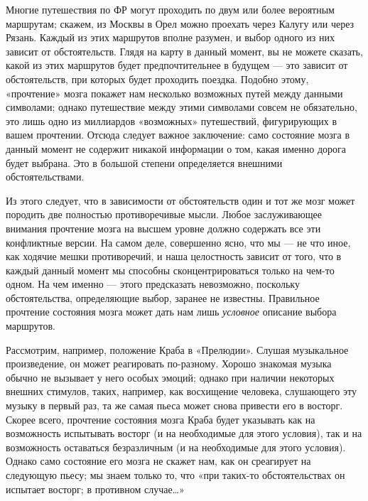 \documentclass[../main.tex]{subfiles}
\begin{document}
Многие путешествия по ФР могут проходить по двум или более вероятным маршрутам; скажем, из Москвы в Орел можно проехать через Калугу или через Рязань. Каждый из этих маршрутов вполне разумен, и выбор одного из них зависит от обстоятельств. Глядя на карту в данный момент, вы не можете сказать, какой из этих маршрутов будет предпочтительнее в будущем --- это зависит от обстоятельств, при которых будет проходить поездка. Подобно этому, «прочтение» мозга покажет нам несколько возможных путей между данными символами; однако путешествие между этими символами совсем не обязательно, это лишь одно из миллиардов «возможных» путешествий, фигурирующих в вашем прочтении. Отсюда следует важное заключение: само состояние мозга в данный момент не содержит никакой информации о том, какая именно дорога будет выбрана. Это в большой степени определяется внешними обстоятельствами.

Из этого следует, что в зависимости от обстоятельств один и тот же мозг может породить две полностью противоречивые мысли. Любое заслуживающее внимания прочтение мозга на высшем уровне должно содержать все эти конфликтные версии. На самом деле, совершенно ясно, что мы --- не что иное, как ходячие мешки противоречий, и наша целостность зависит от того, что в каждый данный момент мы способны сконцентрироваться только на чем-то одном. На чем именно --- этого предсказать невозможно, поскольку обстоятельства, определяющие выбор, заранее не известны. Правильное прочтение состояния мозга может дать нам лишь \emph{условное} описание выбора маршрутов.

Рассмотрим, например, положение Краба в «Прелюдии». Слушая музыкальное произведение, он может реагировать по-разному. Хорошо знакомая музыка обычно не вызывает у него особых эмоций; однако при наличии некоторых внешних стимулов, таких, например, как восхищение человека, слушающего эту музыку в первый раз, та же самая пьеса может снова привести его в восторг. Скорее всего, прочтение состояния мозга Краба будет указывать как на возможность испытывать восторг (и на необходимые для этого условия), так и на возможность оставаться безразличным (и на необходимые для этого условия). Однако само состояние его мозга не скажет нам, как он среагирует на следующую пьесу; мы знаем только то, что «при таких-то обстоятельствах он испытает восторг; в противном случае\ldots»
\end{document}

